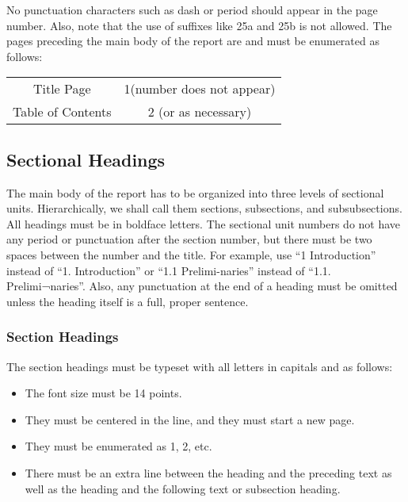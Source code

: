 \documentclass[12pt]{article} %
\numberwithin{equation}{section}
\numberwithin{figure}{section}
\numberwithin{table}{section}
\numberwithin{algorithm}{section}
\begin{document}
No punctuation characters such as dash or period should appear in the page number. Also, note that the use of suffixes like 25a and 25b is not allowed. The pages preceding the main body of the report are and must be enumerated as follows:

\vspace{12pt}

\begin{table}[h]
\centering
\begin{tabular}{cc}
Title Page        & 1(number does not appear) \\
Table of Contents & 2 (or as necessary)      
\end{tabular}
\end{table}

\subsection{Sectional Headings}

The main body of the report has to be organized into three levels of sectional units. Hierarchically, we shall call them sections, subsections, and subsubsections. All headings must be in boldface letters. The sectional unit numbers do not have any period or punctuation after the section number, but there must be two spaces between the number and the title. For example, use “1 Introduction” instead of “1. Introduction” or “1.1 Prelimi-naries” instead of “1.1. Prelimi¬naries”. Also, any punctuation at the end of a heading must be omitted unless the heading itself is a full, proper sentence.

\subsubsection{Section Headings}

The section headings must be typeset with all letters in capitals and as follows:

\begin{itemize}[leftmargin=1.4cm]
    \item The font size must be 14 points.
    \item They must be centered in the line, and they must start a new page.
    \item They must be enumerated as 1, 2, etc.
    \item There must be an extra line between the heading and the preceding text as well as the heading and the following text or subsection heading.
\end{itemize}
\end{document}
